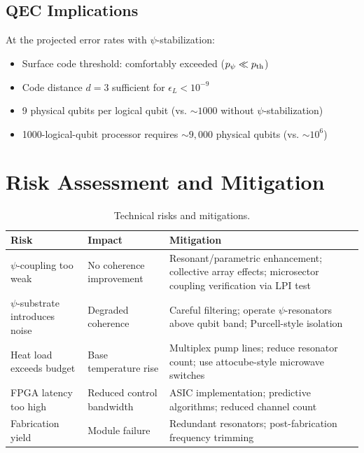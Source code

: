 \documentclass[11pt,letterpaper]{article}
\begin{document}
\subsection{QEC Implications}

At the projected error rates with $\psi$-stabilization:
\begin{itemize}
\item Surface code threshold: comfortably exceeded ($p_\psi \ll p_{\rm th}$)
\item Code distance $d = 3$ sufficient for $\epsilon_L < 10^{-9}$
\item 9 physical qubits per logical qubit (vs. $\sim 1000$ without
$\psi$-stabilization)
\item 1000-logical-qubit processor requires $\sim 9,000$ physical
qubits (vs. $\sim 10^6$)
\end{itemize}

\section{Risk Assessment and Mitigation}

\begin{table}[H]
\caption{Technical risks and mitigations.}
\begin{tabular}{p{3cm}p{4cm}p{4.5cm}}
\toprule
\textbf{Risk} & \textbf{Impact} & \textbf{Mitigation} \\
\midrule
$\psi$-coupling too weak & No coherence improvement &
Resonant/parametric enhancement; collective array effects;
microsector coupling verification via LPI test \\[6pt]
$\psi$-substrate introduces noise & Degraded coherence &
Careful filtering; operate $\psi$-resonators above qubit band;
Purcell-style isolation \\[6pt]
Heat load exceeds budget & Base temperature rise &
Multiplex pump lines; reduce resonator count; use attocube-style
microwave switches \\[6pt]
FPGA latency too high & Reduced control bandwidth &
ASIC implementation; predictive algorithms; reduced channel count \\[6pt]
Fabrication yield & Module failure & Redundant resonators;
post-fabrication frequency trimming \\
\bottomrule
\end{tabular}
\end{table}
\end{document}
